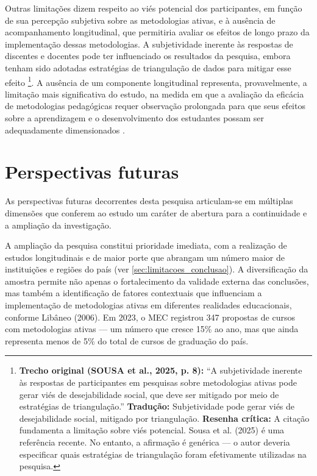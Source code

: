 Outras limitações dizem respeito ao viés potencial dos participantes, em função de sua percepção subjetiva sobre as metodologias ativas, e à ausência de acompanhamento longitudinal, que permitiria avaliar os efeitos de longo prazo da implementação dessas metodologias. A subjetividade inerente às respostas de discentes e docentes pode ter influenciado os resultados da pesquisa, embora tenham sido adotadas estratégias de triangulação de dados para mitigar esse efeito \cite{SOUSA2025}\footnote{\textbf{Trecho original (SOUSA et al., 2025, p. 8):} ``A subjetividade inerente às respostas de participantes em pesquisas sobre metodologias ativas pode gerar viés de desejabilidade social, que deve ser mitigado por meio de estratégias de triangulação.'' \textbf{Tradução:} Subjetividade pode gerar viés de desejabilidade social, mitigado por triangulação. \textbf{Resenha crítica:} A citação fundamenta a limitação sobre viés potencial. Sousa et al. (2025) é uma referência recente. No entanto, a afirmação é genérica — o autor deveria especificar quais estratégias de triangulação foram efetivamente utilizadas na pesquisa.}. A ausência de um componente longitudinal representa, provavelmente, a limitação mais significativa do estudo, na medida em que a avaliação da eficácia de metodologias pedagógicas requer observação prolongada para que seus efeitos sobre a aprendizagem e o desenvolvimento dos estudantes possam ser adequadamente dimensionados \cite{TEODORO2024}.

\section{Perspectivas futuras}
\label{sec:perspectivas_futuras}

As perspectivas futuras decorrentes desta pesquisa articulam-se em múltiplas dimensões que conferem ao estudo um caráter de abertura para a continuidade e a ampliação da investigação.

A ampliação da pesquisa constitui prioridade imediata, com a realização de estudos longitudinais e de maior porte que abrangam um número maior de instituições e regiões do país (ver \ref{sec:limitacoes_conclusao}). A diversificação da amostra permite não apenas o fortalecimento da validade externa das conclusões, mas também a identificação de fatores contextuais que influenciam a implementação de metodologias ativas em diferentes realidades educacionais, conforme Libâneo (2006). Em 2023, o MEC registrou 347 propostas de cursos com metodologias ativas — um número que cresce 15\% ao ano, mas que ainda representa menos de 5\% do total de cursos de graduação do país.

